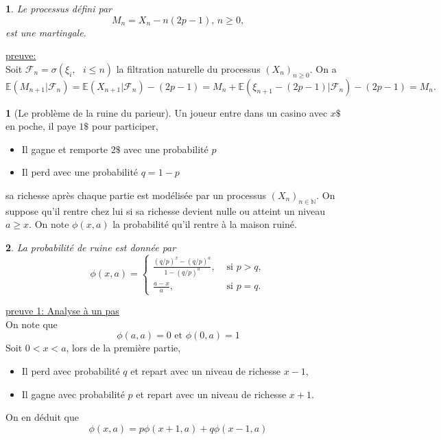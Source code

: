 \documentclass[8pt,notheorems]{beamer}
\def \E{\mathbb E}
\def \N{\mathbb N}
\newtheorem{prop}{\translate{Proposition}}
\theoremstyle{definition}
\theoremstyle{example}
\newtheorem{example}{\translate{Exemple}}
\theoremstyle{mystyle}
\theoremstyle{plain}
\begin{document}
\begin{frame}[allowframebreaks]
\begin{prop}\label{prop:marche_aleatoire_martingale}
Le processus défini par 
$$
M_n = X_n - n(2p-1)\text{, }n\geq 0,
$$
est une martingale. 
\end{prop}
\underline{preuve:}\\
Soit $\mathcal{F}_n = \sigma\left(\xi_i,\text{ }i\leq n\right)$ la filtration naturelle du processus $(X_n)_{n\geq0}$. On a 
$$
\E(M_{n+1}|\mathcal{F}_n) =\E(X_{n+1}|\mathcal{F}_n)-(2p-1) = M_n + \E(\xi_{n+1}- (2p-1)|\mathcal{F}_n)-(2p-1) = M_n.
$$ 
\end{frame}
\begin{frame}[allowframebreaks]
\begin{example}[Le problème de la ruine du parieur]
Un joueur entre dans un casino avec $x\$$ en poche, il paye $1\$$ pour participer,
\begin{itemize}
\item Il gagne et remporte $2\$$ avec une probabilité $p$
\item Il perd avec une probabilité $q=1-p$
\end{itemize}
sa richesse après chaque partie est modélisée par un processus $(X_n)_{n\in\N}$. On suppose qu'il rentre chez lui si sa richesse devient nulle ou atteint un niveau $a\geq x$. On note $\phi(x,a)$ la probabilité qu'il rentre à la maison ruiné.
\end{example}
\begin{prop}
La probabilité de ruine est donnée par
$$
\phi(x,a)=
\begin{cases}
\frac{(q/p)^{x}-(q/p)^{a}}{1-(q/p)^{a}},&\text{ si }p> q,\\
\frac{a-x}{a},&\text{ si }p = q.
\end{cases} 
$$
\end{prop}
\underline{preuve 1: Analyse à un pas}\\
On note que
$$
\phi(a,a)=0\text{ et }\phi(0,a)=1
$$
Soit $0<x<a$, lors de la première partie,
\begin{itemize}
\item Il perd avec probabilité $q$ et repart avec un niveau de richesse $x-1$,
\item Il gagne avec probabilité $p$ et repart avec un niveau de richesse $x+1$.
\end{itemize}
On en déduit que
\begin{equation}\label{eq:ProbaRuine1}
\phi(x,a)= p\phi(x+1,a)+q\phi(x-1,a)
\end{equation}

\end{frame}
\end{document}
